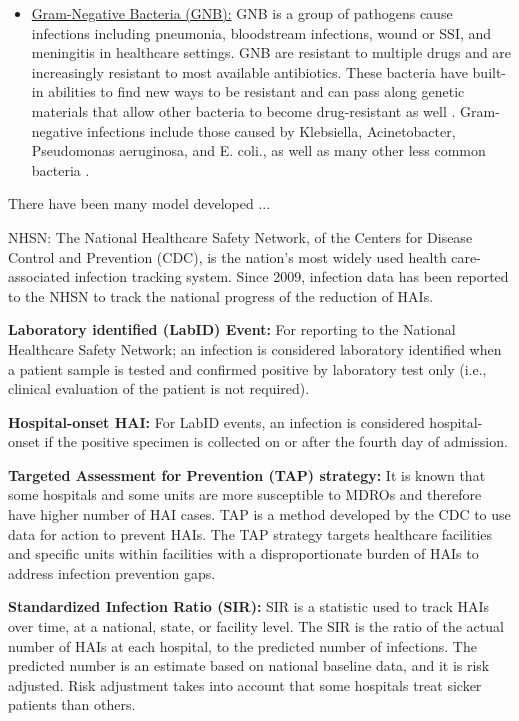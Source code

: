 \begin{itemize}
	\item \underline{Gram-Negative Bacteria (GNB):} GNB is a group of pathogens cause infections including pneumonia, bloodstream infections, wound or SSI, and meningitis in healthcare settings. GNB are resistant to multiple drugs and are increasingly resistant to most available antibiotics. These bacteria have built-in abilities to find new ways to be resistant and can pass along genetic materials that allow other bacteria to become drug-resistant as well \cite{resistance}. Gram-negative infections include those caused by Klebsiella, Acinetobacter, Pseudomonas aeruginosa, and E. coli., as well as many other less common bacteria \cite{gnb}.  
\end{itemize}






There have been many model developed ... 


NHSN: The National Healthcare Safety Network, of the Centers for Disease Control and Prevention (CDC), is the nation’s most widely used health care-associated infection tracking system. Since 2009, infection data has been reported to the NHSN to track the national progress of the reduction of HAIs.
  

{\bf Laboratory identified (LabID) Event:} For reporting to the National Healthcare Safety Network; an infection is considered laboratory
identified when a patient sample is tested and confirmed positive by laboratory test only (i.e., clinical evaluation of the patient is not required).

{\bf Hospital-onset HAI:} For LabID events, an infection is considered hospital-onset if the positive specimen is collected on or after the fourth day of admission.

{\bf Targeted Assessment for Prevention (TAP) strategy:} It is known that some hospitals and some units are more susceptible to MDROs and therefore have higher number of HAI cases. TAP is a method developed by the CDC to use data for action to prevent HAIs. The TAP strategy targets healthcare facilities and specific units within facilities with a disproportionate burden of
HAIs to address infection prevention gaps.

{\bf Standardized Infection Ratio (SIR):} SIR is a statistic used to track HAIs over time, at a national, state, or facility level. The SIR is the ratio of the actual number of HAIs at each hospital, to the predicted number of infections. The predicted number is an estimate based on national baseline data, and it is risk adjusted. Risk adjustment takes into account that some hospitals treat sicker patients than others.


